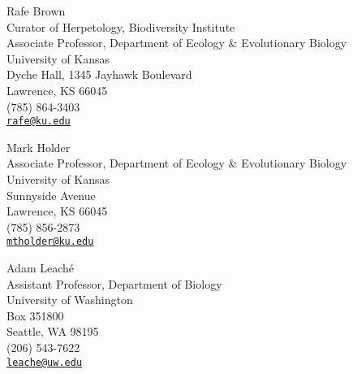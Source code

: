 Rafe Brown \\
\myIndent Curator of Herpetology, Biodiversity Institute \\
\myIndent Associate Professor, Department of Ecology \& Evolutionary Biology \\
\myIndent University of Kansas \\
\myIndent Dyche Hall, 1345 Jayhawk Boulevard \\
\myIndent Lawrence, KS 66045 \\
\myIndent (785) 864-3403 \\
\myIndent \href{mailto:rafe@ku.edu}{\tt rafe@ku.edu}

Mark Holder \\
\myIndent Associate Professor, Department of Ecology \& Evolutionary Biology \\
\myIndent University of Kansas \\
 Sunnyside Avenue \\
\myIndent Lawrence, KS 66045 \\
\myIndent (785) 856-2873 \\
\myIndent \href{mailto:mtholder@ku.edu}{\tt mtholder@ku.edu}


Adam Leach\'{e} \\
\myIndent Assistant Professor, Department of Biology \\
\myIndent University of Washington \\
\myIndent Box 351800 \\
\myIndent Seattle, WA 98195\\
\myIndent (206) 543-7622 \\
\myIndent \href{mailto:leache@uw.edu}{\tt leache@uw.edu}


